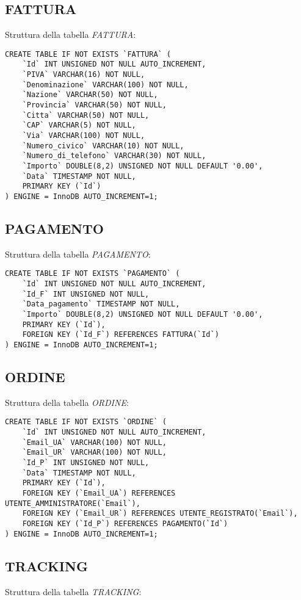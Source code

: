 \subsection{FATTURA}
Struttura della tabella \emph{FATTURA}:

\begin{lstlisting}
CREATE TABLE IF NOT EXISTS `FATTURA` (
	`Id` INT UNSIGNED NOT NULL AUTO_INCREMENT,
	`PIVA` VARCHAR(16) NOT NULL,
	`Denominazione` VARCHAR(100) NOT NULL,
	`Nazione` VARCHAR(50) NOT NULL,
	`Provincia` VARCHAR(50) NOT NULL,
	`Citta` VARCHAR(50) NOT NULL,
	`CAP` VARCHAR(5) NOT NULL,
	`Via` VARCHAR(100) NOT NULL,
	`Numero_civico` VARCHAR(10) NOT NULL,
	`Numero_di_telefono` VARCHAR(30) NOT NULL,
	`Importo` DOUBLE(8,2) UNSIGNED NOT NULL DEFAULT '0.00',
	`Data` TIMESTAMP NOT NULL,
	PRIMARY KEY (`Id`)
) ENGINE = InnoDB AUTO_INCREMENT=1;
\end{lstlisting}

\subsection{PAGAMENTO}
Struttura della tabella \emph{PAGAMENTO}:

\begin{lstlisting}
CREATE TABLE IF NOT EXISTS `PAGAMENTO` (
	`Id` INT UNSIGNED NOT NULL AUTO_INCREMENT,
	`Id_F` INT UNSIGNED NOT NULL,
	`Data_pagamento` TIMESTAMP NOT NULL,
	`Importo` DOUBLE(8,2) UNSIGNED NOT NULL DEFAULT '0.00',
	PRIMARY KEY (`Id`),
	FOREIGN KEY (`Id_F`) REFERENCES FATTURA(`Id`)
) ENGINE = InnoDB AUTO_INCREMENT=1;
\end{lstlisting}

\subsection{ORDINE}
Struttura della tabella \emph{ORDINE}:

\begin{lstlisting}
CREATE TABLE IF NOT EXISTS `ORDINE` (
	`Id` INT UNSIGNED NOT NULL AUTO_INCREMENT,
	`Email_UA` VARCHAR(100) NOT NULL,
	`Email_UR` VARCHAR(100) NOT NULL,
	`Id_P` INT UNSIGNED NOT NULL,
	`Data` TIMESTAMP NOT NULL,
	PRIMARY KEY (`Id`),
	FOREIGN KEY (`Email_UA`) REFERENCES UTENTE_AMMINISTRATORE(`Email`),
	FOREIGN KEY (`Email_UR`) REFERENCES UTENTE_REGISTRATO(`Email`),
	FOREIGN KEY (`Id_P`) REFERENCES PAGAMENTO(`Id`)
) ENGINE = InnoDB AUTO_INCREMENT=1;
\end{lstlisting}

\subsection{TRACKING}
Struttura della tabella \emph{TRACKING}:

